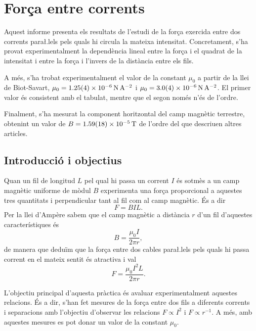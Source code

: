 \chapter{Força entre corrents} \label{ch:informe 2}
\begin{resum}
	Aquest informe presenta els resultats de l'estudi de la força exercida entre dos corrents para\l.lels pels quals hi circula la mateixa intensitat. Concretament, s'ha provat experimentalment la dependència lineal entre la força i el quadrat de la intensitat i entre la força i l'invers de la distància entre els fils.

	A més, s'ha trobat experimentalment el valor de la constant \( \mu_0 \) a partir de la llei de Biot-Savart, \( \mu_0 = \data{1.25}{0.04e-6}{N.A^{-2}} \) i \( \mu_0 = \data{3.0}{0.4d-6}{N.A^{-2}} \). El primer valor és consistent amb el tabulat, mentre que el segon només n'és de l'ordre. 

	Finalment, s'ha mesurat la component horitzontal del camp magnètic terrestre, obtenint un valor de \( B = \data{1.59}{0.18d-5}{T} \) de l'ordre del que descriuen altres articles.
\end{resum}

\section{Introducció i objectius}
Quan un fil de longitud \( L \) pel qual hi passa un corrent \( I \) és sotmès a un camp magnètic uniforme de mòdul \( B \) experimenta una força proporcional a aquestes tres quantitats i perpendicular tant al fil com al camp magnètic. És a dir
\begin{equation} \label{eq:forca magnetica} 
	F = BIL.
\end{equation}
Per la llei d'Ampère sabem que el camp magnètic a distància \( r \) d'un fil d'aquestes característiques és 
\begin{equation*}
	B = \frac{\mu_0 I}{2\pi r},
\end{equation*}
de manera que deduïm que la força entre dos cables para\l.lels pels quals hi passa corrent en el mateix sentit és atractiva i val
\begin{equation} \label{eq:forca i corrent}
	F = \frac{\mu_0I^2L}{2\pi r}.
\end{equation}

L'objectiu principal d'aquesta pràctica és avaluar experimentalment aquestes relacions. És a dir, s'han fet mesures de la força entre dos fils a diferents corrents i separacions amb l'objectiu d'observar les relacions \( F \propto I^2 \) i \( F \propto r^{-1} \). A més, amb aquestes mesures es pot donar un valor de la constant \( \mu_0 \).  

